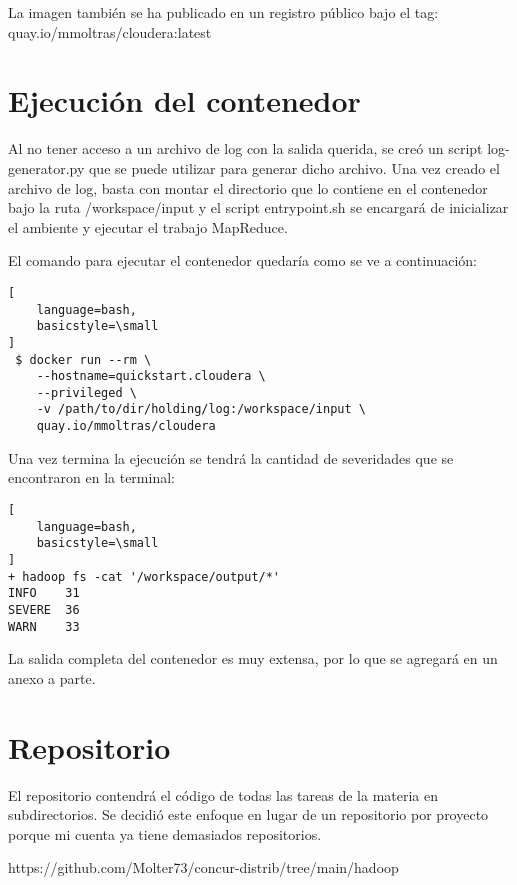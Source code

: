 \documentclass[a4paper]{article}
\begin{document}
La imagen también se ha publicado en un registro público bajo el tag:
quay.io/mmoltras/cloudera:latest

\section{Ejecución del contenedor}

Al no tener acceso a un archivo de log con la salida querida, se creó un script
log-generator.py que se puede utilizar para generar dicho archivo. Una vez
creado el archivo de log, basta con montar el directorio que lo contiene en
el contenedor bajo la ruta /workspace/input y el script entrypoint.sh se
encargará de inicializar el ambiente y ejecutar el trabajo MapReduce.

El comando para ejecutar el contenedor quedaría como se ve a continuación:

\begin{lstlisting}[
    language=bash,
    basicstyle=\small
]
 $ docker run --rm \
    --hostname=quickstart.cloudera \
    --privileged \
    -v /path/to/dir/holding/log:/workspace/input \
    quay.io/mmoltras/cloudera
\end{lstlisting}

Una vez termina la ejecución se tendrá la cantidad de severidades que se
encontraron en la terminal:

\begin{lstlisting}[
    language=bash,
    basicstyle=\small
]
+ hadoop fs -cat '/workspace/output/*'
INFO    31
SEVERE  36
WARN    33
\end{lstlisting}

La salida completa del contenedor es muy extensa, por lo que se agregará en un
anexo a parte.

\section{Repositorio}

El repositorio contendrá el código de todas las tareas de la materia en
subdirectorios. Se decidió este enfoque en lugar de un repositorio por proyecto
porque mi cuenta ya tiene demasiados repositorios.

https://github.com/Molter73/concur-distrib/tree/main/hadoop

\appendix
\end{document}
